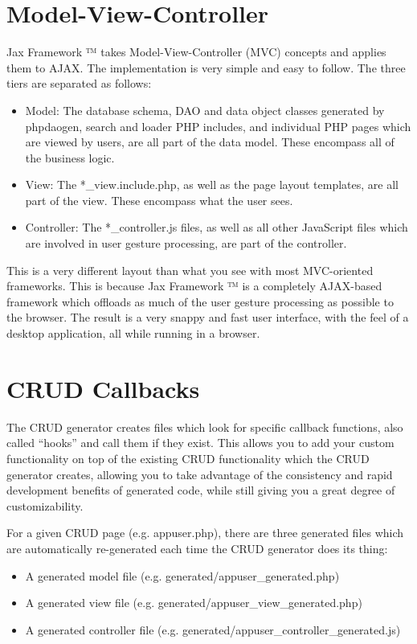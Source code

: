 \documentclass[letterpaper,10pt,english]{sphinxmanual}
\begin{document}
\section{Model-View-Controller}
\label{jaxFrameworkGuide:model-view-controller}
Jax Framework ™ takes Model-View-Controller (MVC) concepts and applies them to AJAX.  The
implementation is very simple and easy to follow.  The three tiers are separated as follows:
\begin{itemize}
\item {} 
Model: The database schema, DAO and data object classes generated by phpdaogen, search and loader
PHP includes, and individual PHP pages which are viewed by users, are all part of the data model.
These encompass all of the business logic.

\item {} 
View: The *\_view.include.php, as well as the page layout templates, are all part of the view.
These encompass what the user sees.

\item {} 
Controller: The *\_controller.js files, as well as all other JavaScript files which are involved
in user gesture processing, are part of the controller.

\end{itemize}

This is a very different layout than what you see with most MVC-oriented frameworks.  This is
because Jax Framework ™ is a completely AJAX-based framework which offloads as much of the
user gesture processing as possible to the browser.  The result is a very snappy and fast user
interface, with the feel of a desktop application, all while running in a browser.


\section{CRUD Callbacks}
\label{jaxFrameworkGuide:crud-callbacks}
The CRUD generator creates files which look for specific callback functions, also called ``hooks'' and
call them if they exist.  This allows you to add your custom functionality on top of the existing
CRUD functionality which the CRUD generator creates, allowing you to take advantage of the
consistency and rapid development benefits of generated code, while still giving you a great degree
of customizability.

For a given CRUD page (e.g. appuser.php), there are three generated files which are automatically
re-generated each time the CRUD generator does its thing:
\begin{itemize}
\item {} 
A generated model file (e.g. generated/appuser\_generated.php)

\item {} 
A generated view file (e.g. generated/appuser\_view\_generated.php)

\item {} 
A generated controller file (e.g. generated/appuser\_controller\_generated.js)

\end{itemize}
\end{document}
